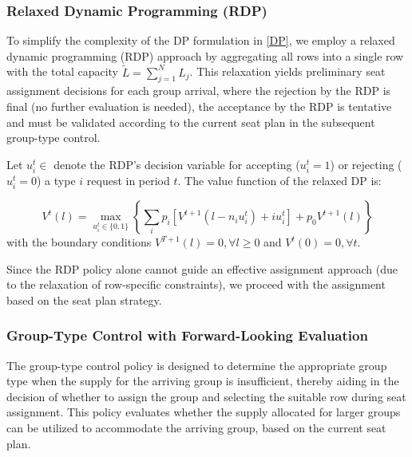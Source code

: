 \subsubsection{Relaxed Dynamic Programming (RDP)}
To simplify the complexity of the DP formulation in \eqref{DP}, we employ a relaxed dynamic programming (RDP) approach by aggregating all rows into a single row with the total capacity $\tilde{L} = \sum_{j=1}^{N} L_j$. This relaxation yields preliminary seat assignment decisions for each group arrival, where the rejection by the RDP is final (no further evaluation is needed), the acceptance by the RDP is tentative and must be validated according to the current seat plan in the subsequent group-type control.


Let $u_{i}^{t} \in $ denote the RDP's decision variable for accepting ($u_{i}^{t} = 1$) or rejecting ($u_{i}^{t} = 0$) a type $i$ request in period $t$. The value function of the relaxed DP is:

\begin{equation}\label{DP_relaxed}
V^{t}(l) =  \max_{u_{i}^{t} \in \{0,1\}} \left\{ \sum_{i} p_i \left[V^{t+1}(l-n_i u_{i}^{t})+ i u_{i}^{t}\right] + p_0 V^{t+1}(l)\right\}
\end{equation}
with the boundary conditions $V^{T+1}(l) =0, \forall l \geq 0$ and $V^{t}(0) =0, \forall t$.

Since the RDP policy alone cannot guide an effective assignment approach (due to the relaxation of row-specific constraints), we proceed with the assignment based on the seat plan strategy.





\subsubsection{Group-Type Control with Forward-Looking Evaluation}\label{nested_policy}
The group-type control policy is designed to determine the appropriate group type when the supply for the arriving group is insufficient, thereby aiding in the decision of whether to assign the group and selecting the suitable row during seat assignment. This policy evaluates whether the supply allocated for larger groups can be utilized to accommodate the arriving group, based on the current seat plan.

